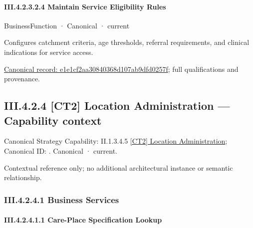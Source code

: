 \paragraph*{III.4.2.3.2.4 Maintain Service Eligibility Rules}
\label{navigation:III.4.2.3.2.4}

\label{element:e1e1cf2aa30840368d107ab9dfd0257f}
{\small BusinessFunction · Canonical · current}\par

Configures catchment criteria, age thresholds, referral requirements, and clinical indications for service access.


{\footnotesize \href{../../../../continuum/business/business-function/e1e1cf2aa30840368d107ab9dfd0257f.md}{Canonical record: e1e1cf2aa30840368d107ab9dfd0257f}; full qualifications and provenance.}\par
\subsection*{III.4.2.4 [CT2] Location Administration — Capability context}
\label{navigation:III.4.2.4}

{\small Canonical Strategy Capability: II.1.3.4.5 \hyperref[element:c410005667444f99a221483bf577fad2]{[CT2] Location Administration}; Canonical ID: \texttt{}. Canonical · current.}\par
Contextual reference only; no additional architectural instance or semantic relationship.\par
\subsubsection*{III.4.2.4.1 Business Services}
\label{navigation:III.4.2.4.1}

\paragraph*{III.4.2.4.1.1 Care-Place Specification Lookup}
\label{navigation:III.4.2.4.1.1}

